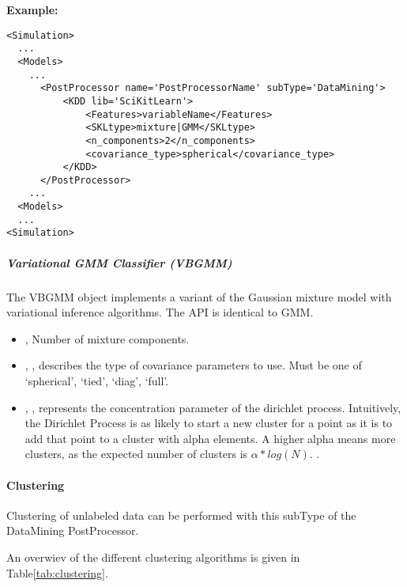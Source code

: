 \textbf{Example:}
\begin{lstlisting}[style=XML,morekeywords={subType}]
<Simulation>
  ...
  <Models>
    ...
      <PostProcessor name='PostProcessorName' subType='DataMining'>
          <KDD lib='SciKitLearn'>
              <Features>variableName</Features>
              <SKLtype>mixture|GMM</SKLtype>
              <n_components>2</n_components>
              <covariance_type>spherical</covariance_type>
          </KDD>
      </PostProcessor>
    ...
  <Models>
  ...
<Simulation>
\end{lstlisting}

\subparagraph{ Variational GMM Classifier (VBGMM)} \hfill
\label{subparagraph:VBGMM}

The VBGMM object implements a variant of the Gaussian mixture model
 with variational inference algorithms. The API is identical to GMM.

\begin{itemize}
	\item {},  Number of mixture components. 
	\item {}, , describes the type of covariance parameters to use.
Must be one of ‘spherical’, ‘tied’, ‘diag’, ‘full’. 
	\item {}, ,
represents the concentration parameter of the dirichlet process.
Intuitively, the Dirichlet Process is as likely to start a new cluster
 for a point as it is to add that point to a cluster with alpha
 elements. A higher alpha means more clusters, as the expected
number of clusters is ${\alpha*log(N)}$. .
\end{itemize}

\paragraph{ Clustering }
\label{paragraph:Clustering}

Clustering of unlabeled data can be performed with this subType of
 the DataMining PostProcessor.

An overwiev of the different clustering algorithms is given in
Table\ref{tab:clustering}.

